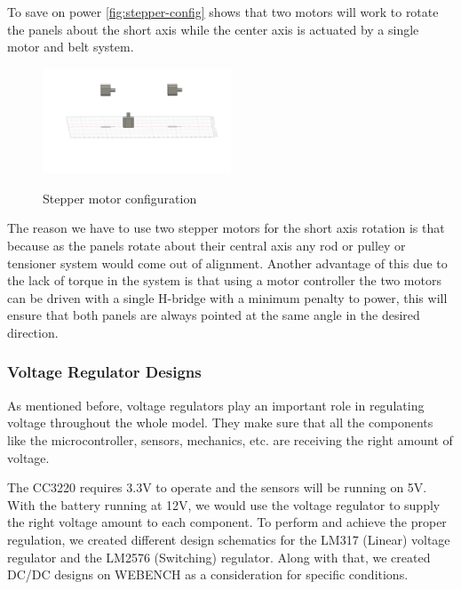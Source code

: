 To save on power \autoref{fig:stepper-config} shows that two motors will work to rotate the panels about the short axis while the center axis is actuated by a single motor and belt system.
\begin{figure}[H]
    \centering
    \caption{Stepper motor configuration}
    \includegraphics[width=0.5\textwidth]{images/stepper-config.png}
    \label{fig:stepper-config}
\end{figure}
The reason we have to use two stepper motors for the short axis rotation is that because as the panels rotate about their central axis any rod or pulley or tensioner system would come out of alignment. Another advantage of this due to the lack of torque in the system is that using a motor controller the two motors can be driven with a single H-bridge with a minimum penalty to power, this will ensure that both panels are always pointed at the same angle in the desired direction.\par
\subsubsection{Voltage Regulator Designs}
As mentioned before, voltage regulators play an important role in regulating voltage throughout the whole model. They make sure that all the components like the microcontroller, sensors, mechanics, etc. are receiving the right amount of voltage.\par
The CC3220 requires 3.3V to operate and the sensors will be running on 5V. With the battery running at 12V, we would use the voltage regulator to supply the right voltage amount to each component. To perform and achieve the proper regulation, we created different design schematics for the LM317 (Linear) voltage regulator and the LM2576 (Switching) regulator. Along with that, we created DC/DC designs on WEBENCH as a consideration for specific conditions.\par

